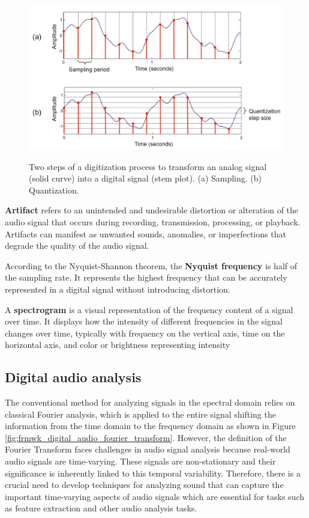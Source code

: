 \begin{figure}[htbp]
    \raggedright
        \caption{Two steps of a digitization process to transform an analog signal (solid curve) into a digital signal (stem plot). (a) Sampling. (b) Quantization.}
        \includegraphics[width=1.0\textwidth]{resources/images/030-theoretical_framework/Framework_audio_fund_digitization_process.png}
        \label{fig:frmwk_audio_fund_digitization_process}
\end{figure}

\textbf{Artifact} refers to an unintended and undesirable distortion or alteration of the audio signal that occurs during recording, transmission, processing, or playback. Artifacts can manifest as unwanted sounds, anomalies, or imperfections that degrade the quality of the audio signal.

According to the Nyquist-Shannon theorem, the \textbf{Nyquist frequency} is half of the sampling rate. It represents the highest frequency that can be accurately represented in a digital signal without introducing distortion.

A \textbf{spectrogram} is a visual representation of the frequency content of a signal over time. It displays how the intensity of different frequencies in the signal changes over time, typically with frequency on the vertical axis, time on the horizontal axis, and color or brightness representing intensity


\subsection{Digital audio analysis}
\label{subsec:audio_fundamentals_digital_audio_analsys}

The conventional method for analyzing signals in the spectral domain relies on classical Fourier analysis, which is applied to the entire signal shifting the information from the time domain to the frequency domain as shown in Figure \ref{fig:frmwk_digital_audio_fourier_transform}. However, the definition of the Fourier Transform faces challenges in audio signal analysis because real-world audio signals are time-varying. These signals are non-stationary and their significance is inherently linked to this temporal variability. Therefore, there is a crucial need to develop techniques for analyzing sound that can capture the important time-varying aspects of audio signals which are essential for tasks such as feature extraction and other audio analysis tasks.

